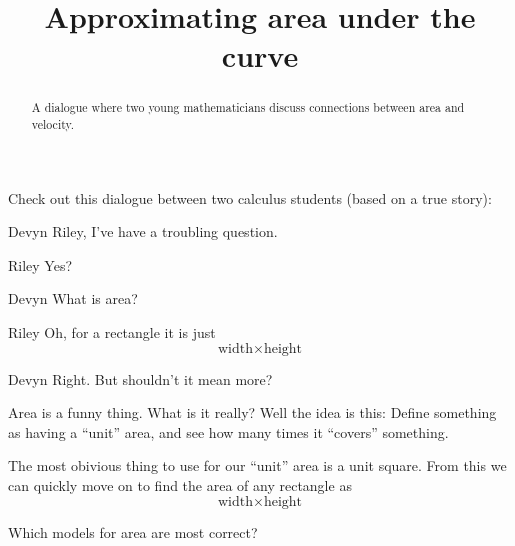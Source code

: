 \documentclass{ximera}
\title[Break-Ground:]{Approximating area under the curve}
\begin{document}
\begin{abstract}
A dialogue where two young mathematicians discuss connections between
area and velocity.
\end{abstract}
\maketitle




Check out this dialogue between two calculus students (based on a true
story):

\begin{dialogue}
\item[Devyn] Riley, I've have a troubling question.
\item[Riley] Yes? 
\item[Devyn] What is area?
\item[Riley] Oh, for a rectangle it is just
  \[
  \text{width}\times \text{height}
  \]
\item[Devyn] Right. But shouldn't it mean more?
\end{dialogue}

Area is a funny thing. What is it really? Well the idea is this:
Define something as having a ``unit'' area, and see how many times it
``covers'' something.

The most obivious thing to use for our ``unit'' area is a unit
square. From this we can quickly move on to find the area of any
rectangle as 
  \[
  \text{width}\times \text{height}
  \]
  \begin{problem}
    Which models for area are most correct?
    \begin{selectAll}
      
    \end{selectAll}
  \end{problem}
  


\end{document}
